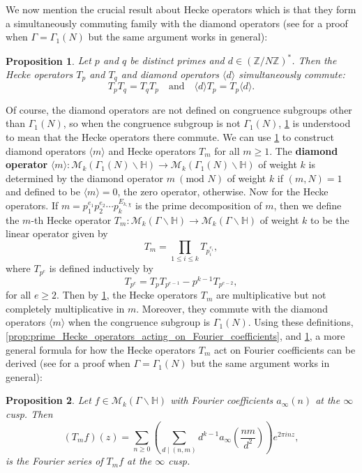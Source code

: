 \documentclass[12pt]{book}
\newtheorem{proposition}{Proposition}[section]
\theoremstyle{definition}\newframedtheorem{method}{Method}
\newcommand{\tmod}[1]{\ \left(\text{mod }#1\right)}
\newcommand{\mc}{\mathcal}
\newcommand{\Z}{\mathbb{Z}}
\renewcommand{\H}{\mathbb{H}}
\newcommand{\G}{\Gamma}
\newcommand{\<}{\langle}
\renewcommand{\>}{\rangle}
\newcommand{\GH}{\G\backslash\H}
\begin{document}
      We now mention the crucial result about Hecke operators which is that they form a simultaneously commuting family with the diamond operators (see \cite{diamond2005first} for a proof when $\G = \G_{1}(N)$ but the same argument works in general):

      \begin{proposition}\label{prop:Hecke_operators_commute}
        Let $p$ and $q$ be distinct primes and $d \in (\Z/N\Z)^{\ast}$. Then the Hecke operators $T_{p}$ and $T_{q}$ and diamond operators $\<d\>$ simultaneously commute:
        \[
          T_{p}T_{q} = T_{q}T_{p} \quad \text{and} \quad \<d\>T_{p} = T_{p}\<d\>.
        \]
      \end{proposition}

      Of course, the diamond operators are not defined on congruence subgroups other than $\G_{1}(N)$, so when the congruence subgroup is not $\G_{1}(N)$, \cref{prop:Hecke_operators_commute} is understood to mean that the Hecke operators there commute. We can use \cref{prop:Hecke_operators_commute} to construct diamond operators $\<m\>$ and Hecke operators $T_{m}$ for all $m \ge 1$. The \textbf{diamond operator} $\<m\>:\mc{M}_{k}(\G_{1}(N)\backslash\H) \to \mc{M}_{k}(\G_{1}(N)\backslash\H)$ of weight $k$ is determined by the diamond operator $m \tmod{N}$ of weight $k$ if $(m,N) = 1$ and defined to be $\<m\> = 0$, the zero operator, otherwise. Now for the Hecke operators. If $m = p_{1}^{e_{1}}p_{2}^{e_{2}} \cdots p_{k}^{E_{k,\chi}}$ is the prime decomposition of $m$, then we define the $m$-th Hecke operator $T_{m}:\mc{M}_{k}(\GH) \to \mc{M}_{k}(\GH)$ of weight $k$ to be the linear operator given by
      \[
        T_{m} = \prod_{1 \le i \le k}T_{p_{i}^{e_{i}}},
      \]
      where $T_{p^{e}}$ is defined inductively by
      \[
        T_{p^{e}} = T_{p}T_{p^{e-1}}-p^{k-1}T_{p^{e-2}},
      \]
      for all $e \ge 2$. Then by \cref{prop:Hecke_operators_commute}, the Hecke operators $T_{m}$ are multiplicative but not completely multiplicative in $m$. Moreover, they commute with the diamond operators $\<m\>$ when the congruence subgroup is $\G_{1}(N)$. Using these definitions, \cref{prop:prime_Hecke_operators_acting_on_Fourier_coefficients}, and \cref{prop:Hecke_operators_commute}, a more general formula for how the Hecke operators $T_{m}$ act on Fourier coefficients can be derived (see \cite{diamond2005first} for a proof when $\G = \G_{1}(N)$ but the same argument works in general):

      \begin{proposition}\label{prop:general_Hecke_operators_acting_on_Fourier_coefficients}
        Let $f \in \mc{M}_{k}(\GH)$ with Fourier coefficients $a_{\infty}(n)$ at the $\infty$ cusp. Then
        \[
          (T_{m}f)(z) = \sum_{n \ge 0}\left(\sum_{d \mid (n,m)}d^{k-1}a_{\infty}\left(\frac{nm}{d^{2}}\right)\right)e^{2\pi inz},
        \]
        is the Fourier series of $T_{m}f$ at the $\infty$ cusp.
      \end{proposition}
\end{document}
